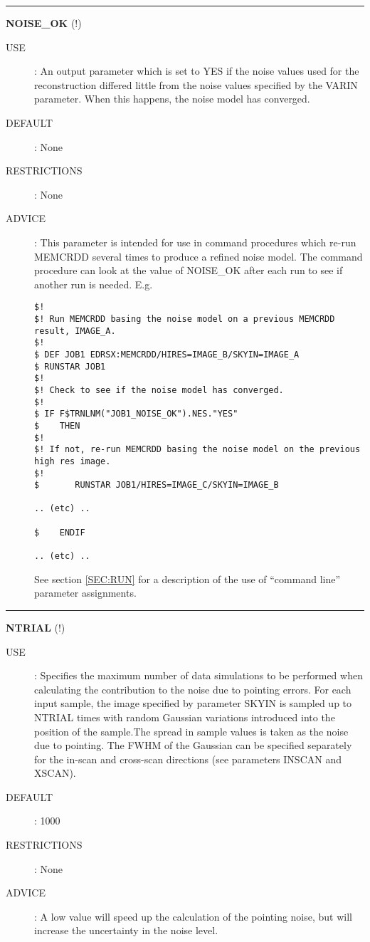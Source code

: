 \rule{\textwidth}{0.3mm}
{\Large {\bf NOISE\_OK} (!)}
\begin{description}
\item [USE]:
An output parameter which is set to YES if the noise values used for the
reconstruction differed little from the noise values specified by the VARIN
parameter. When this happens, the noise model has converged.
\item [DEFAULT]:
None
\item [RESTRICTIONS]:
None
\item [ADVICE]:
This parameter is intended for use in command procedures which re-run MEMCRDD
several times to produce a refined noise model. The command procedure can look
at the value of NOISE\_OK after each run to see if another run is needed. E.g.
\begin{verbatim}
$!
$! Run MEMCRDD basing the noise model on a previous MEMCRDD result, IMAGE_A.
$!
$ DEF JOB1 EDRSX:MEMCRDD/HIRES=IMAGE_B/SKYIN=IMAGE_A
$ RUNSTAR JOB1
$!
$! Check to see if the noise model has converged.
$!
$ IF F$TRNLNM("JOB1_NOISE_OK").NES."YES"
$    THEN
$!
$! If not, re-run MEMCRDD basing the noise model on the previous high res image.
$!
$       RUNSTAR JOB1/HIRES=IMAGE_C/SKYIN=IMAGE_B

.. (etc) ..

$    ENDIF

.. (etc) ..

\end{verbatim}
See section \ref {SEC:RUN} for a description of the use of ``command line''
parameter assignments.
\end {description}

\rule{\textwidth}{0.3mm}
{\Large {\bf NTRIAL} (!)}
\begin{description}
\item [USE]:
Specifies the maximum number of data simulations to be performed when
calculating the contribution to the noise due to pointing errors. For each input
sample, the image specified by parameter SKYIN is sampled up to NTRIAL times with
random Gaussian variations introduced into the position of the sample.The
spread in sample values is taken as the noise due to pointing. The FWHM of the
Gaussian can be specified separately for the in-scan and cross-scan directions
(see parameters INSCAN and XSCAN).
\item [DEFAULT]:
1000
\item [RESTRICTIONS]:
None
\item [ADVICE]:
A low value will speed up the calculation of the pointing noise, but will
increase the uncertainty in the noise level.
\end {description}

